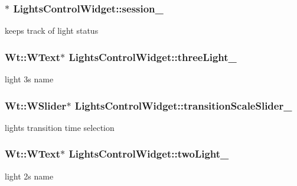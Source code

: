 \subsubsection[{\texorpdfstring{session\+\_\+}{session_}}]{$\ast$ Lights\+Control\+Widget\+::session\+\_\+\hspace{0.3cm}{\ttfamily [private]}}\hypertarget{classLightsControlWidget_ad27e600149ef3590947a491470dcb4c8}{}\label{classLightsControlWidget_ad27e600149ef3590947a491470dcb4c8}
keeps track of light status 
\subsubsection[{\texorpdfstring{three\+Light\+\_\+}{threeLight_}}]{\setlength{\rightskip}{0pt plus 5cm}Wt\+::\+W\+Text$\ast$ Lights\+Control\+Widget\+::three\+Light\+\_\+\hspace{0.3cm}{\ttfamily [private]}}\hypertarget{classLightsControlWidget_a82b1ded41fd126f7f4e041ab5b0b7ccb}{}\label{classLightsControlWidget_a82b1ded41fd126f7f4e041ab5b0b7ccb}
light 3\textquotesingle{}s name 
\subsubsection[{\texorpdfstring{transition\+Scale\+Slider\+\_\+}{transitionScaleSlider_}}]{\setlength{\rightskip}{0pt plus 5cm}Wt\+::\+W\+Slider$\ast$ Lights\+Control\+Widget\+::transition\+Scale\+Slider\+\_\+\hspace{0.3cm}{\ttfamily [private]}}\hypertarget{classLightsControlWidget_af4bd66ddc5244ab9cf62dea9e5ffb1cf}{}\label{classLightsControlWidget_af4bd66ddc5244ab9cf62dea9e5ffb1cf}
light\textquotesingle{}s transition time selection 
\subsubsection[{\texorpdfstring{two\+Light\+\_\+}{twoLight_}}]{\setlength{\rightskip}{0pt plus 5cm}Wt\+::\+W\+Text$\ast$ Lights\+Control\+Widget\+::two\+Light\+\_\+\hspace{0.3cm}{\ttfamily [private]}}\hypertarget{classLightsControlWidget_a1148be7db38088bb15fc356e06e13b65}{}\label{classLightsControlWidget_a1148be7db38088bb15fc356e06e13b65}
light 2\textquotesingle{}s name 
